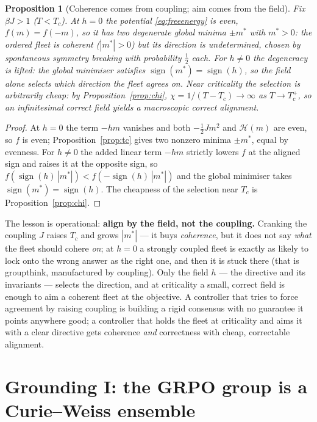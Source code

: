 \documentclass[11pt]{article}
\newtheorem{proposition}{Proposition}
\DeclareMathOperator{\sign}{sign}
\begin{document}
\begin{proposition}[Coherence comes from coupling; aim comes from the field]
\label{prop:aim}
Fix $\beta J>1$ ($T<T_c$). At $h=0$ the potential \eqref{eq:freeenergy} is even, $f(m)=f(-m)$, so it has two
degenerate global minima $\pm m^{*}$ with $m^{*}>0$: the ordered fleet is coherent ($|m^{*}|>0$) but its
direction is undetermined, chosen by spontaneous symmetry breaking with probability $\tfrac12$ each. For
$h\neq0$ the degeneracy is lifted: the global minimiser satisfies $\sign(m^{*})=\sign(h)$, so the field alone
selects which direction the fleet agrees on. Near criticality the selection is arbitrarily cheap: by
Proposition~\ref{prop:chi}, $\chi=1/(T-T_c)\to\infty$ as $T\to T_c^{+}$, so an infinitesimal correct field
yields a macroscopic correct alignment.
\end{proposition}

\begin{proof}
At $h=0$ the term $-hm$ vanishes and both $-\tfrac12Jm^2$ and $\mathcal{H}(m)$ are even, so $f$ is even;
Proposition~\ref{prop:tc} gives two nonzero minima $\pm m^{*}$, equal by evenness. For $h\neq0$ the added linear
term $-hm$ strictly lowers $f$ at the aligned sign and raises it at the opposite sign, so
$f(\sign(h)\,|m^{*}|)<f(-\sign(h)\,|m^{*}|)$ and the global minimiser takes $\sign(m^{*})=\sign(h)$. The
cheapness of the selection near $T_c$ is Proposition~\ref{prop:chi}.
\end{proof}

The lesson is operational: \textbf{align by the field, not the coupling.} Cranking the coupling $J$ raises
$T_c$ and grows $|m^{*}|$ --- it buys \emph{coherence}, but it does not say \emph{what} the fleet should cohere
\emph{on}; at $h=0$ a strongly coupled fleet is exactly as likely to lock onto the wrong answer as the right
one, and then it is stuck there (that is groupthink, manufactured by coupling). Only the field $h$ --- the
directive and its invariants --- selects the direction, and at criticality a small, correct field is enough to
aim a coherent fleet at the objective. A controller that tries to force agreement by raising coupling is
building a rigid consensus with no guarantee it points anywhere good; a controller that holds the fleet at
criticality and aims it with a clear directive gets coherence \emph{and} correctness with cheap, correctable
alignment.

\section{Grounding I: the GRPO group is a Curie--Weiss ensemble}
\label{sec:grpo}
\end{document}

